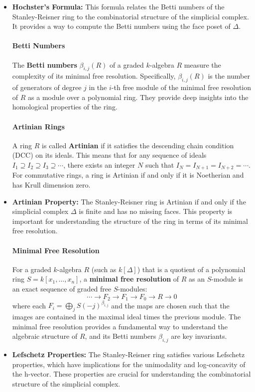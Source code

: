 \documentclass[12pt]{article}
\theoremstyle{definition}
\numberwithin{equation}{subsection}
\begin{document}
\begin{itemize}
\item \textbf{Hochster's Formula:} This formula relates the Betti numbers of the Stanley-Reisner ring to the combinatorial structure of the simplicial complex. It provides a way to compute the Betti numbers using the face poset of $\Delta$.

\paragraph{Betti Numbers}
The \textbf{Betti numbers} $\beta_{i,j}(R)$ of a graded $k$-algebra $R$ measure the complexity of its minimal free resolution. Specifically, $\beta_{i,j}(R)$ is the number of generators of degree $j$ in the $i$-th free module of the minimal free resolution of $R$ as a module over a polynomial ring. They provide deep insights into the homological properties of the ring.

\paragraph{Artinian Rings}
A ring $R$ is called \textbf{Artinian} if it satisfies the descending chain condition (DCC) on its ideals. This means that for any sequence of ideals $I_1 \supseteq I_2 \supseteq I_3 \supseteq \cdots$, there exists an integer $N$ such that $I_N = I_{N+1} = I_{N+2} = \cdots$. For commutative rings, a ring is Artinian if and only if it is Noetherian and has Krull dimension zero.

\item \textbf{Artinian Property:} The Stanley-Reisner ring is Artinian if and only if the simplicial complex $\Delta$ is finite and has no missing faces. This property is important for understanding the structure of the ring in terms of its minimal free resolution.

\paragraph{Minimal Free Resolution}
For a graded $k$-algebra $R$ (such as $k[\Delta]$) that is a quotient of a polynomial ring $S = k[x_1, \ldots, x_n]$, a \textbf{minimal free resolution} of $R$ as an $S$-module is an exact sequence of graded free $S$-modules:
\[
\cdots \to F_2 \to F_1 \to F_0 \to R \to 0
\]
where each $F_i = \bigoplus_j S(-j)^{\beta_{i,j}}$ and the maps are chosen such that the images are contained in the maximal ideal times the previous module. The minimal free resolution provides a fundamental way to understand the algebraic structure of $R$, and its Betti numbers $\beta_{i,j}$ are key invariants.
\item \textbf{Lefschetz Properties:} The Stanley-Reisner ring satisfies various Lefschetz properties, which have implications for the unimodality and log-concavity of the h-vector. These properties are crucial for understanding the combinatorial structure of the simplicial complex.


\end{itemize}
\end{document}
